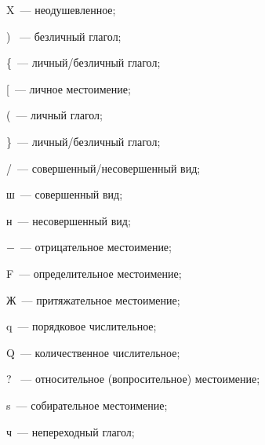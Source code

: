 X~--- неодушевленное;





) ~--- безличный глагол;





\{~--- личный/безличный глагол;





[~--- личное местоимение;





(~--- личный глагол;





\}~--- личный/безличный глагол;





/~--- совершенный/несовершенный вид;





ш~--- совершенный вид;





н~--- несовершенный вид;





$-$~--- отрицательное местоимение;





F~--- определительное местоимение;





Ж~--- притяжательное местоимение;





q~--- порядковое числительное;





Q~--- количественное числительное;





? ~--- относительное (вопросительное) местоимение;





s~--- собирательное местоимение;





ч~--- непереходный глагол;





